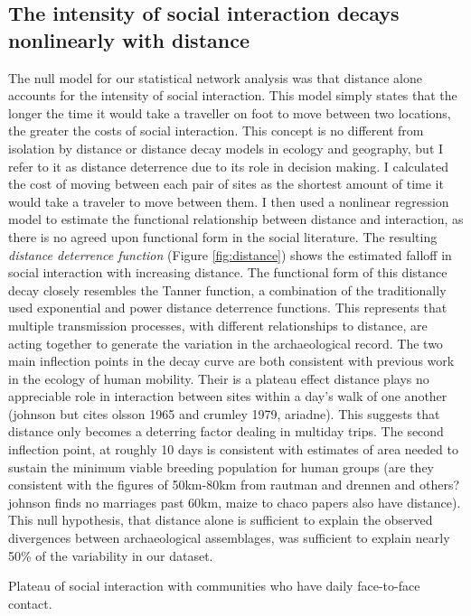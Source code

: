 \documentclass[11pt]{wlscirep}
\begin{document}
\subsection*{The intensity of social interaction decays nonlinearly with distance}
The null model for our statistical network analysis was that distance alone accounts for the intensity of social interaction. This model simply states that the longer the time it would take a traveller on foot to move between two locations, the greater the costs of social interaction. This concept is no different from isolation by distance or distance decay models in ecology and geography, but I refer to it as distance deterrence due to its role in decision making. I calculated the cost of moving between each pair of sites as the shortest amount of time it would take a traveler to move between them. I then used a nonlinear regression model to estimate the functional relationship between distance and interaction, as there is no agreed upon functional form in the social literature. 
The resulting \textit{distance deterrence function} (Figure \ref{fig:distance}) shows the estimated falloff in social interaction with increasing distance. The functional form of this distance decay closely resembles the Tanner function, a combination of the traditionally used exponential and power distance deterrence functions. This represents that multiple transmission processes, with different relationships to distance, are acting together to generate the variation in the archaeological record. The two main inflection points in the decay curve are both consistent with previous work in the ecology of human mobility. Their is a plateau effect distance plays no appreciable role in interaction between sites within a day's walk of one another (johnson but cites olsson 1965 and crumley 1979, ariadne). This suggests that distance only becomes a deterring factor dealing in multiday trips. The second inflection point, at roughly 10 days is consistent with estimates of area needed to sustain the minimum viable breeding population for human groups (are they consistent with the figures of 50km-80km from rautman and drennen and others? johnson finds no marriages past 60km, maize to chaco papers also have distance). This null hypothesis, that distance alone is sufficient to explain the observed divergences between archaeological assemblages, was sufficient to explain nearly 50\% of the variability in our dataset.  

Plateau of social interaction with communities who have daily face-to-face contact.
\end{document}
